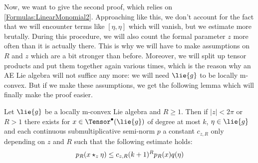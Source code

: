 Now, we want to give the second proof, which relies on 
\eqref{Formulas:LinearMonomial2}. Approaching like this, we don't account for 
the fact that we will encounter terms like $[\eta, \eta]$ which will vanish, 
but we estimate more brutally. During this procedure, we will also count the 
formal parameter $z$ more often than it is actually there. This is why we will 
have to make assumptions on $R$ and $z$ which are a bit stronger than before. 
Moreover, we will split up tensor products and put them together again various 
times, which is the reason why an AE Lie algebra will not suffice any more: we 
will need $\lie{g}$ to be locally m-convex. But if we make these assumptions, 
we get the following lemma which will finally make the proof easier.
\begin{lemma}
    \label{LCAna:Lemma:PreContinuity2}%
    Let $\lie{g}$ be a locally m-convex Lie algebra and $R \geq1$. 
    Then if $|z| < 2 \pi$ or $R >1$ there exists for $x \in
    \Tensor^{\bullet}(\lie{g})$ of degree at most $k$, $\eta \in \lie{g}$
    and each continuous submultiplicative semi-norm $p$ a constant $c_{z,R}$ 
    only depending on $z$ and $R$ such that the following estimate holds:
    \begin{equation}
        \label{LCAna:PreContinuity2}
        p_R(x \star_z \eta)
        \leq
        c_{z,R} (k+1)^R p_R(x) q(\eta)
    \end{equation}
\end{lemma}
